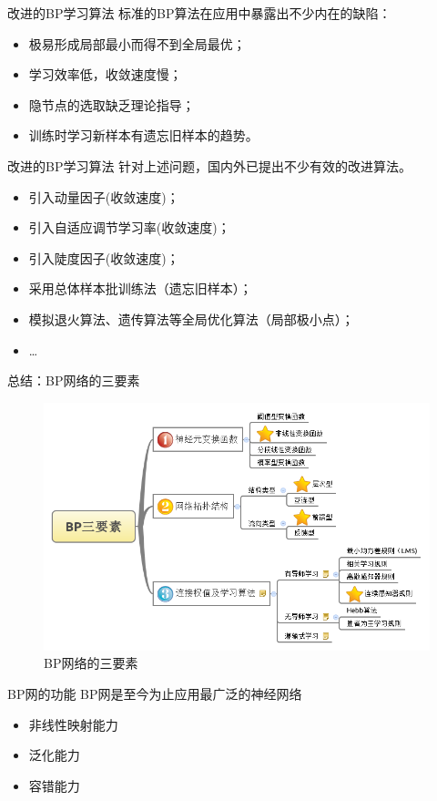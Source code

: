 \documentclass[xcolor=svgnames]{beamer}
\begin{document}
\begin{frame}{改进的BP学习算法}
  标准的BP算法在应用中暴露出不少内在的缺陷：
  \begin{itemize}
  \item 极易形成局部最小而得不到全局最优；
  \item 学习效率低，收敛速度慢；
  \item 隐节点的选取缺乏理论指导；
  \item 训练时学习新样本有遗忘旧样本的趋势。
  \end{itemize}
\end{frame}

\begin{frame}{改进的BP学习算法}
  针对上述问题，国内外已提出不少有效的改进算法。
  \begin{itemize}
  \item 引入动量因子(收敛速度)；
  \item 引入自适应调节学习率(收敛速度)；
  \item 引入陡度因子(收敛速度)；
  \item 采用总体样本批训练法（遗忘旧样本）；
  \item 模拟退火算法、遗传算法等全局优化算法（局部极小点）；
  \item \ldots
  \end{itemize}
\end{frame}

\begin{frame}{总结：BP网络的三要素}
  \centering
  \begin{figure}
    \includegraphics[width=.8\textwidth]{fig11.png}
    \caption{BP网络的三要素}
    \label{fig:bp3elements}
  \end{figure}
\end{frame}


\begin{frame}{BP网的功能}
  BP网是至今为止应用最广泛的神经网络

  \begin{itemize}
  \item
    非线性映射能力
  \item
    泛化能力
  \item
    容错能力
  \end{itemize}
\end{frame}
\end{document}
